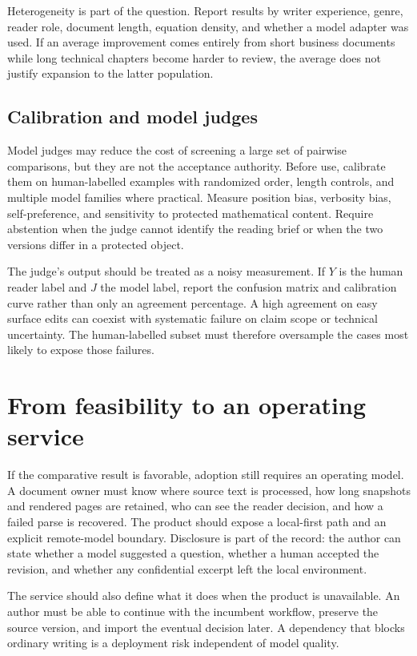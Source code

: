Heterogeneity is part of the question. Report results by writer experience,
genre, reader role, document length, equation density, and whether a model
adapter was used. If an average improvement comes entirely from short business
documents while long technical chapters become harder to review, the average
does not justify expansion to the latter population.

\subsection{Calibration and model judges}

Model judges may reduce the cost of screening a large set of pairwise
comparisons, but they are not the acceptance authority. Before use, calibrate
them on human-labelled examples with randomized order, length controls, and
multiple model families where practical. Measure position bias, verbosity
bias, self-preference, and sensitivity to protected mathematical content.
Require abstention when the judge cannot identify the reading brief or when
the two versions differ in a protected object.

The judge's output should be treated as a noisy measurement. If $Y$ is the
human reader label and $J$ the model label, report the confusion matrix and
calibration curve rather than only an agreement percentage. A high agreement
on easy surface edits can coexist with systematic failure on claim scope or
technical uncertainty. The human-labelled subset must therefore oversample
the cases most likely to expose those failures.

\section{From feasibility to an operating service}

If the comparative result is favorable, adoption still requires an operating
model. A document owner must know where source text is processed, how long
snapshots and rendered pages are retained, who can see the reader decision,
and how a failed parse is recovered. The product should expose a local-first
path and an explicit remote-model boundary. Disclosure is part of the record:
the author can state whether a model suggested a question, whether a human
accepted the revision, and whether any confidential excerpt left the local
environment.

The service should also define what it does when the product is unavailable.
An author must be able to continue with the incumbent workflow, preserve the
source version, and import the eventual decision later. A dependency that
blocks ordinary writing is a deployment risk independent of model quality.

